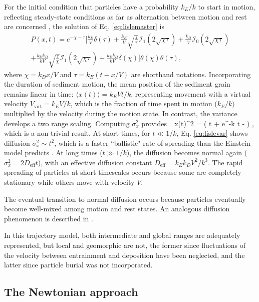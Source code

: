 For the initial condition that particles have a probability $k_E/k$ to start in motion, reflecting steady-state conditions as far as alternation between motion and rest are concerned \citep[e.g.][]{Ancey2006}, the solution of Eq. \ref{eq:lislemaster} is \citep{Lisle1998}
\begin{multline}  P(x,t) =  e^{-\chi-\tau} \Big[ \frac{k_E}{V}\delta(\tau) + \frac{k_E}{V} \sqrt{\frac{\chi}{\tau}}\mathcal{I}_1(2\sqrt{\chi\tau}) + \frac{k_D}{V}\mathcal{I}_0(2\sqrt{\chi\tau}) \\
	+ \frac{k_Ek_D}{kV}\sqrt{\frac{\tau}{\chi}}\mathcal{I}_1(2\sqrt{\chi\tau}) + \frac{k_Ek_D}{kV} \delta(\chi)
	\Big]\theta(\chi)\theta(\tau), \label{eq:lisledist}
\end{multline}
where $\chi = k_D x/V$ and $\tau = k_E(t-x/V)$ are shorthand notations.
Incorporating the duration of sediment motion, the mean position of the sediment grain remains linear in time: $\langle x (t) \rangle  = k_E V t/k$, representing movement with a virtual velocity $V_\text{virt} = k_E V/k$, which is the fraction of time spent in motion ($k_E/k)$ \citep{Ancey2006} multiplied by the velocity during the motion state. In contrast, the variance develops a two range scaling.
Computing $\sigma_x^2$ provides
\be \sigma_x(t)^2 = \Big( t + e^{-k t} - \Big) , \label{eq:lislevar}\ee
which is a non-trivial result. At short times, for $t\ll 1/k$, Eq. \ref{eq:lislevar} shows diffusion $\sigma_x^2 \sim t^2$, which is a faster ``ballistic" rate of spreading than the Einstein model predicts \citep{Sokolov2012}. At long times ($t\gg 1/k$), the diffusion becomes normal again ($\sigma_x^2 = 2 D_\text{eff} t$), with an effective diffusion constant $ D_\text{eff} = k_E k_D V^2/k^3$. 
The rapid spreading of particles at short timescales occurs because some are completely stationary while others move with velocity $V$.

The eventual transition to normal diffusion occurs because particles eventually become well-mixed among motion and rest states. An analogous diffusion phenomenon is described in \citet{Taylor1920}.

In this trajectory model, both intermediate and global ranges are adequately represented, but local and geomorphic are not, the former since fluctuations of the velocity between entrainment and deposition have been neglected, and the latter since particle burial was not incorporated.

\subsection{The Newtonian approach}

